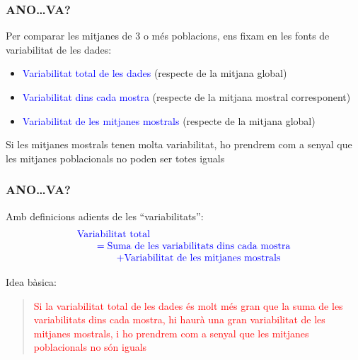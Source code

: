 \documentclass[12pt,t]{beamer}
\newcommand{\red}[1]{\textcolor{red}{#1}}
\newcommand{\blue}[1]{\textcolor{blue}{#1}}
\theoremstyle{plain}
\theoremstyle{definition}
\begin{document}
\begin{frame}
\frametitle{ANO\ldots VA?}

Per comparar les mitjanes de 3 o més poblacions, ens fixam en les fonts de variabilitat de les dades:
\medskip

\begin{itemize}
\item \blue{Variabilitat total de les dades} (respecte de la mitjana global)
\medskip

\item \blue{Variabilitat dins cada mostra} (respecte de la mitjana mostral corresponent)
\medskip

\item \blue{Variabilitat de les mitjanes mostrals} (respecte de la mitjana global)
\medskip
\end{itemize}\medskip

Si les mitjanes mostrals tenen molta variabilitat, ho prendrem com a senyal que les mitjanes poblacionals no poden ser totes iguals


\end{frame}




\begin{frame}
\frametitle{ANO\ldots VA?}


Amb definicions adients de les ``variabilitats'':
$$
\begin{array}{l}
\mbox{\blue{Variabilitat total}}\\
\qquad \blue{= \mbox{Suma de les variabilitats dins cada mostra}}\\
\qquad\qquad\blue{+ \mbox{Variabilitat de les mitjanes mostrals}}
\end{array}
$$


Idea bàsica:\medskip

\begin{quote}
 \red{Si la variabilitat total de les dades és molt més gran que la suma de les variabilitats dins cada mostra, hi haurà una gran variabilitat de les mitjanes mostrals, i ho prendrem com a senyal que les mitjanes poblacionals no són iguals}
\end{quote}
\end{frame}
\end{document}
